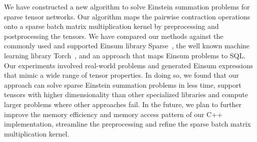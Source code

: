 We have constructed a new algorithm to solve Einstein summation problems for sparse tensor networks.
Our algorithm maps the pairwise contraction operations onto a sparse batch matrix multiplication kernel
by preprocessing and postprocessing the tensors. We have compared our methods against the commonly used
and supported Einsum library Sparse~\cite{sparse}, the well known machine learning library
Torch~\cite{pytorch}, and an approach that maps Einsum problems to SQL. Our experiments involved
real-world problems and generated Einsum expressions that mimic a wide range of tensor properties.
In doing so, we found that our approach can solve sparse Einstein summation problems in less time,
support tensors with higher dimensionality than other specialized libraries and compute larger problems
where other approaches fail. In the future, we plan to further improve the memory efficiency and
memory access pattern of our C++ implementation, streamline the preprocessing and refine the
sparse batch matrix multiplication kernel.
